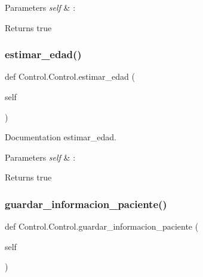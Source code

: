 \begin{DoxyParams}{Parameters}
{\em self} & \+: \\
\hline
\end{DoxyParams}
\begin{DoxyReturn}{Returns}
true 
\end{DoxyReturn}
\mbox{\label{class_control_1_1_control_a214b0abae8fa56b8a6e4dae3cd053e7d}} 
\subsubsection{\texorpdfstring{estimar\+\_\+edad()}{estimar\_edad()}}
{\footnotesize\ttfamily def Control.\+Control.\+estimar\+\_\+edad (\begin{DoxyParamCaption}\item[{}]{self }\end{DoxyParamCaption})}



Documentation estimar\+\_\+edad. 


\begin{DoxyParams}{Parameters}
{\em self} & \+: \\
\hline
\end{DoxyParams}
\begin{DoxyReturn}{Returns}
true 
\end{DoxyReturn}
\mbox{\label{class_control_1_1_control_a0dc2a9739a717d5ff1163b803ddb8b26}} 
\subsubsection{\texorpdfstring{guardar\+\_\+informacion\+\_\+paciente()}{guardar\_informacion\_paciente()}}
{\footnotesize\ttfamily def Control.\+Control.\+guardar\+\_\+informacion\+\_\+paciente (\begin{DoxyParamCaption}\item[{}]{self }\end{DoxyParamCaption})}



